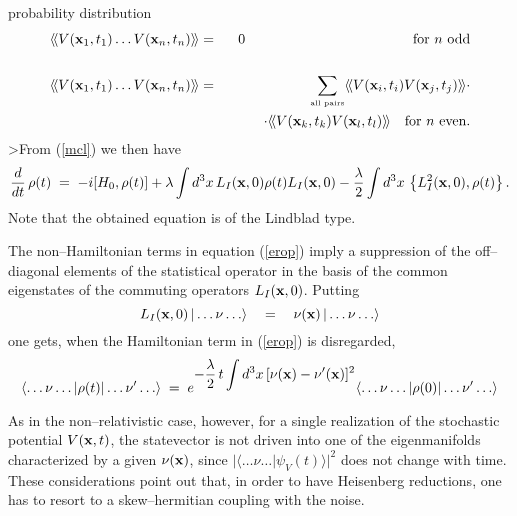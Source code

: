 \documentclass[10pt,a4paper]{article}
\newcommand{\llangle}{\langle\!\langle}
\newcommand{\rrangle}{\rangle\!\rangle}
\begin{document}
probability distribution
\begin{eqnarray}
\llangle V({\bf x}_{1}, t_{1})\ldots V({\bf x}_{n}, t_{n})
\rrangle & = & 0 \quad\qquad\qquad\qquad\qquad\qquad\quad
\makebox{for $n$ odd} \nonumber \\
& & \\
\llangle V({\bf x}_{1}, t_{1})\ldots V({\bf x}_{n}, t_{n})
\rrangle & = & \sum_{\makebox{\tiny all pairs}} \llangle V({\bf
x}_{i}, t_{i}) V({\bf x}_{j}, t_{j})
\rrangle\cdot \nonumber \\
& & \qquad\;\; \cdot \llangle V({\bf x}_{k}, t_{k}) V({\bf x}_{l},
t_{l}) \rrangle \quad \makebox{for $n$ even.} \nonumber
\end{eqnarray}
>From (\ref{mcl}) we then have
\begin{equation} \label{erop}
\frac{d}{dt}\,\rho(t) \; = \; -i [H_{0}, \rho(t)] + \lambda \int
d^{3}x\, L_{I}({\bf x}, 0) \rho(t) L_{I}({\bf x}, 0) -
\frac{\lambda}{2} \int d^{3}x\, \left\{ L_{I}^{2}({\bf x}, 0),
\rho(t) \right\}.
\end{equation}
Note that the obtained equation is of the Lindblad type.

The non--Hamiltonian terms in equation (\ref{erop}) imply a
suppression of the off--diagonal elements of the statistical
operator in the basis of the common eigenstates of the commuting
operators $L_{I}({\bf x}, 0)$. Putting
\begin{equation}
L_{I}({\bf x}, 0)\, |\ldots \nu \ldots \rangle \quad = \quad
\nu({\bf x})\, |\ldots \nu \ldots \rangle
\end{equation}
one gets, when the Hamiltonian term in (\ref{erop}) is
disregarded,
\begin{equation}
\langle\ldots\nu\ldots|\rho(t)|\ldots\nu'\ldots\rangle\; = \;
e^{\displaystyle -\frac{\lambda}{2}\,t\int d^{3}x\, [\nu({\bf x})
- \nu'({\bf x})]^{2}}
\langle\ldots\nu\ldots|\rho(0)|\ldots\nu'\ldots\rangle
\end{equation}

As in the non--relativistic case, however, for a single
realization of the stochastic potential $V({\bf x}, t)$, the
statevector is not driven into one of the eigenmanifolds
characterized by a given $\nu({\bf x})$, since
$|\langle\ldots\nu\ldots|\psi_{V}(t) \rangle|^{2}$ does not change
with time. These considerations point out that, in order to have
Heisenberg reductions, one has to resort to a skew--hermitian
coupling with the noise.
\end{document}
